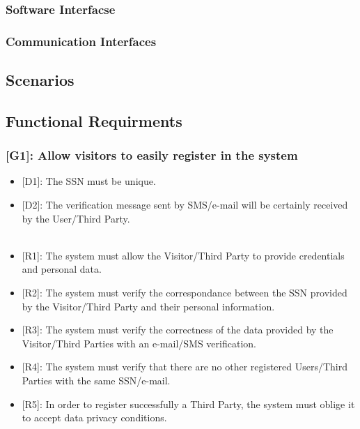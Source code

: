 \documentclass[12pt,a4paper]{article}
\begin{document}
			\subsubsection{Software Interfacse}
			\subsubsection{Communication Interfaces}
			
		\subsection{Scenarios}
			
	\newpage
	
	\subsection{Functional Requirments}
		
		\subsubsection*{{[}{G1}{]}: Allow visitors to easily register in the system}
			\begin{itemize}
				\begin{itemize}
					\item {[D1]}: The SSN must be unique.
					\item {[D2]}: The verification message sent by SMS/e-mail will be certainly received by the User/Third Party.
					\\\\
					\item {[R1]}: The system must allow the Visitor/Third Party to provide credentials and personal data.
					\item {[R2]}: The system must verify the correspondance between the SSN provided by the Visitor/Third Party and their personal information.
					\item {[R3]}: The system must verify the correctness of the data provided by the Visitor/Third Parties with an e-mail/SMS verification.
					\item {[R4]}: The system must verify that there are no other registered Users/Third Parties with the same SSN/e-mail.
					\item {[R5]}: In order to register successfully a Third Party, the system must oblige it to accept data privacy conditions.
				\end{itemize} 
			\end{itemize}
\end{document}
